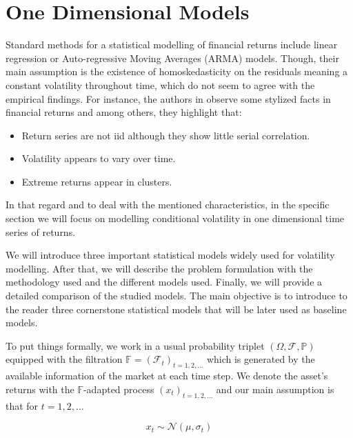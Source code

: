 \documentclass[a4paper, oneside]{discothesis}
\begin{document}
\section{One Dimensional Models}\label{one_d}
Standard methods for a statistical modelling of financial returns include linear regression or Auto-regressive Moving Averages (ARMA)  models. Though, their main assumption is the existence of homoskedasticity on the residuals meaning a constant volatility throughout time, which do not seem to agree with the empirical findings. For instance, the authors in \cite{QRM} observe some stylized facts in financial returns and among others, they highlight that:
\begin{itemize}
    \item Return series are not iid although they show little serial correlation.
    \item Volatility appears to vary over time.
    \item  Extreme returns appear in clusters.
\end{itemize}

In that regard and to deal with the mentioned characteristics, in the specific section we will focus on modelling conditional volatility in one dimensional time series of returns.

We will introduce three important statistical models widely used for volatility modelling. After that, we will describe the problem formulation with the methodology used and the different models used. Finally, we will provide a detailed comparison of the studied models. The main objective is to introduce to the reader three cornerstone statistical models that will be later used as baseline models. 

To put things formally, we work in a usual probability triplet $\left( \Omega, \mathcal{F}, \mathbb{P}\right)$ equipped with the filtration $\mathbb{F} = \left(\mathcal{F}_t\right)_{t = 1, 2, \dots}$ which is generated by the available information of the market at each time step. We denote the asset's returns with the $\mathbb{F}$-adapted process  $\left(x_t\right)_{t = 1, 2, \dots}$ and our main assumption is that for $t = 1,2,\dots$ 

\begin{equation}\label{eq:1d-ass}
x_t \sim \mathcal{N}\left(\mu, \sigma_t\right)
\end{equation}
\end{document}
